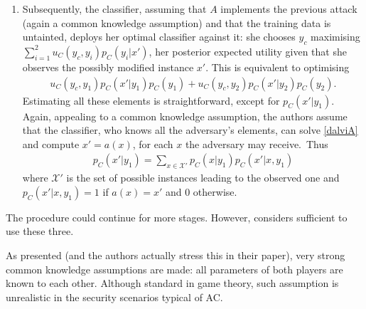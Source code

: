 \begin{enumerate}
\item Subsequently, the classifier, assuming that $A$ implements the previous attack (again a common knowledge assumption) and that the training data is untainted, deploys her optimal classifier against it:
she chooses $y_c$ maximising $\sum_{i=1}^2 u_C(y_c, y_i) p_C(y_i |x')$, her posterior expected utility given that she observes the possibly modified instance $x'$. This is equivalent to optimising 
%
\begin{eqnarray}\label{dalviCK}
u_C (y_c, y_1) p_C(x' |y_1) p_C(y_1) + u_C (y_c, y_2) p_C(x' |y_2) p_C(y_2).
\end{eqnarray}
%
Estimating all these elements is straightforward, except for $p_C(x' \vert y_1)$. Again, appealing to a common knowledge assumption, the authors assume that the classifier, who knows all the adversary's elements, can solve 
\eqref{dalviA} and compute $x' = a(x)$, for each $x$ the adversary may receive.~Thus
%
\begin{eqnarray*} 
p_C(x' |y_1) = \sum_{x \in \mathcal{X}'} p_C (x \vert y_1) p_C (x' \vert x, y_1)
\end{eqnarray*}
where $\mathcal{X}'$ is the set of possible instances leading to the observed one and $p_C(x' \vert x, y_1) = 1$ if $a(x) = x'$ and 0 otherwise.
%
%
\end{enumerate}
%
The procedure could continue for more stages.
However, \cite{adversarialClassification2004} considers sufficient to use these three.


As presented (and the authors actually stress this
in their paper), very strong common knowledge assumptions are made: all parameters of both players are known to each other. Although standard in game theory, such  assumption is unrealistic in the security scenarios  
typical of AC.



